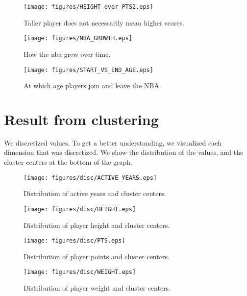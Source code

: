 \documentclass{article}
\begin{document}
\begin{figure}[h]
    \centering
    \texttt{[image: figures/HEIGHT\_over\_PTS2.eps]}
    \caption{Taller player does not necessarily mean higher scores.}
\end{figure}

\begin{figure}[h]
    \centering
    \texttt{[image: figures/NBA\_GROWTH.eps]}
    \caption{How the nba grew over time.}
\end{figure}

\begin{figure}[h]
    \centering
    \texttt{[image: figures/START\_VS\_END\_AGE.eps]}
    \caption{At which age players join and leave the NBA.}
\end{figure}

\clearpage

\section{Result from clustering}

We discretized values.
To get a better understanding, we visualized each dimension that was discretized.
We show the distribution of the values, and the cluster centers at the bottom of the graph.

\begin{figure}[h]
    \centering
    \texttt{[image: figures/disc/ACTIVE\_YEARS.eps]}
    \caption{Distribution of active years and cluster centers.}
\end{figure}
\begin{figure}[h]
    \centering
    \texttt{[image: figures/disc/HEIGHT.eps]}
    \caption{Distribution of player height and cluster centers.}
\end{figure}
\begin{figure}[h]
    \centering
    \texttt{[image: figures/disc/PTS.eps]}
    \caption{Distribution of player points and cluster centers.}
\end{figure}
\begin{figure}[h]
    \centering
    \texttt{[image: figures/disc/WEIGHT.eps]}
    \caption{Distribution of player weight and cluster centers.}
\end{figure}
\end{document}

